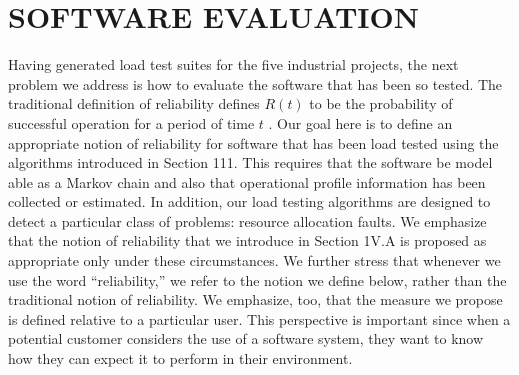 \documentclass[journal, twoside]{IEEEtran}
\begin{document}
\section{SOFTWARE EVALUATION}
Having generated load test suites for the five industrial
projects, the next problem we address is how to evaluate the
software that has been so tested. The traditional definition of
reliability defines $R(t)$ to be the probability of successful operation for a period of time $t$ \cite{b6} . Our goal here is to define an appropriate notion of reliability for software that has been load
tested using the algorithms introduced in Section 111. This requires that the software be model able as a Markov chain and
also that operational profile information has been collected or
estimated. In addition, our load testing algorithms are designed
to detect a particular class of problems: resource allocation
faults. We emphasize that the notion of reliability that we introduce in Section 1V.A is proposed as appropriate only under
these circumstances. We further stress that whenever we use
the word “reliability,” we refer to the notion we define below,
rather than the traditional notion of reliability. We emphasize,
too, that the measure we propose is defined relative to a particular user. This perspective is important since when a potential customer considers the use of a software system, they want
to know how they can expect it to perform in their
environment. 
\vspace{2cm}
\end{document}
